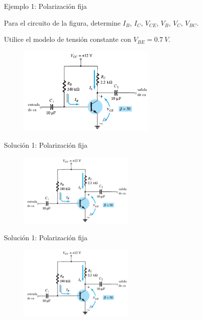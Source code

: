 \documentclass[t,aspectratio=169]{beamer}
\begin{document}
\begin{frame}{Ejemplo 1: Polarización fija}

Para el circuito de la figura, determine $I_B$, $I_C$, $V_{CE}$, $V_B$, $V_C$, $V_{BC}$. 

Utilice el modelo de tensión constante con $V_{BE} = 0.7\ V$.

\begin{figure}
    \centering
    \includegraphics[width=0.6\textwidth]{figures/polarizacion_fija_ejemplo.png} 
\end{figure}

\end{frame}


\begin{frame}{Solución 1: Polarización fija}

\begin{figure}
    \flushleft
    \includegraphics[width=0.5\textwidth]{figures/polarizacion_fija_ejemplo.png} 
\end{figure}

\end{frame}

\begin{frame}{Solución 1: Polarización fija}

\begin{figure}
    \flushleft
    \includegraphics[width=0.5\textwidth]{figures/polarizacion_fija_ejemplo.png} 
\end{figure}

\end{frame}
\end{document}
